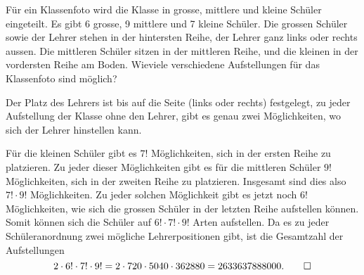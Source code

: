 Für ein Klassenfoto wird die Klasse in grosse, mittlere und kleine
Schüler eingeteilt. Es gibt 6 grosse, 9 mittlere und 7 kleine
Schüler. Die grossen Schüler sowie der Lehrer stehen in der
hintersten Reihe, der Lehrer ganz links oder rechts aussen. Die mittleren
Schüler sitzen in der mittleren Reihe, und die kleinen in der
vordersten Reihe am Boden. Wieviele verschiedene Aufstellungen für das
Klassenfoto sind möglich?


\begin{loesung}
Der Platz des Lehrers ist bis auf die Seite (links oder rechts)
festgelegt, zu jeder Aufstellung der Klasse ohne den Lehrer, gibt
es genau zwei Möglichkeiten, wo sich der Lehrer hinstellen kann.

Für die kleinen Schüler gibt es $7!$ Möglichkeiten, sich in
der ersten Reihe zu platzieren. Zu jeder dieser Möglichkeiten
gibt es für die mittleren Schüler $9!$ Möglichkeiten, sich in
der zweiten Reihe zu platzieren. Insgesamt sind dies also $7! \cdot 9!$
Möglichkeiten. Zu jeder solchen Möglichkeit gibt es jetzt noch $6!$
Möglichkeiten, wie sich die grossen Schüler in der letzten Reihe
aufstellen können. Somit können sich die Schüler auf $6!\cdot 7!\cdot 9!$
Arten aufstellen. Da es zu jeder Schüleranordnung zwei mögliche
Lehrerpositionen gibt, ist die Gesamtzahl der Aufstellungen
\[
2\cdot 6!\cdot 7!\cdot 9!=
2\cdot 720 \cdot 5040 \cdot 362880=2633637888000.
\qedhere
\]
\end{loesung}

